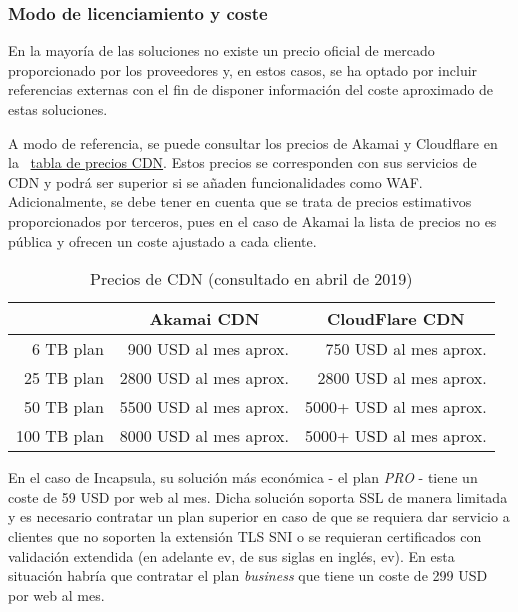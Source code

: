 \subsubsection{Modo de licenciamiento y coste}
\label{subsec:wafsaaslic}
\par En la mayoría de las soluciones no existe un precio oficial de mercado proporcionado por los proveedores y, en estos casos, se ha optado por
incluir referencias externas con el fin de disponer información del coste aproximado de estas soluciones.
\par A modo de referencia, se puede consultar los precios de Akamai y Cloudflare en la {~\hyperref[tab:precioscdn]{tabla de precios CDN}}.
Estos precios se corresponden con sus servicios de CDN y podrá ser superior si se añaden funcionalidades como WAF. Adicionalmente, se debe
tener en cuenta que se trata de precios estimativos proporcionados por terceros, pues en el caso de Akamai la lista de precios no es pública y
ofrecen un coste ajustado a cada cliente.
\begin{table}[h!]
  \centering
  \label{tab:precioscdn}
  \begin{tabular}{rrr}
     &
    \multicolumn{1}{c}{\textbf{Akamai CDN}} &
    \multicolumn{1}{c}{\textbf{CloudFlare CDN}} \\
    \hline \hline
    6 TB plan   & 900  USD al mes aprox.  & 750   USD al mes aprox. \\
    \hline
    25 TB plan  & 2800 USD al mes aprox.  & 2800  USD al mes aprox. \\
    \hline
    50 TB plan  & 5500 USD al mes aprox.  & 5000+ USD al mes aprox. \\
    \hline
    100 TB plan & 8000 USD al mes aprox.  & 5000+ USD al mes aprox. \\
    \hline
  \end{tabular}
  \caption{Precios de CDN\cite{cdnprices} (consultado en abril de 2019)}
\end{table}

\par En el caso de Incapsula, su solución más económica - el plan {\em PRO} -  tiene un coste de 59 USD por web al mes\cite{incapsulaprices}.
Dicha solución soporta SSL de manera limitada y es necesario contratar un plan superior en caso de que se requiera dar servicio a clientes que
no soporten la extensión TLS \acrshort{SNI} o se requieran certificados con validación extendida (en adelante \acrshort{ev}, de sus siglas en
inglés, \acrlong{ev}). En esta situación habría que contratar el plan {\em business} que tiene un coste de 299 USD por web al
mes\cite{incapsulaprices}.

